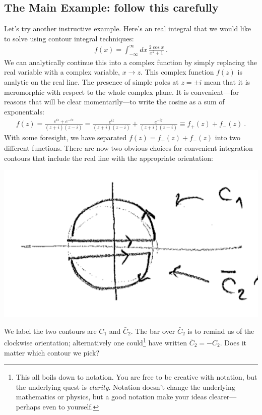 \subsection{The Main Example: follow this carefully}
Let's try another instructive example. Here's an real integral that we would like to solve using contour integral techniques:
\begin{align}
f(x) = \int_{-\infty}^\infty  dx\,
\frac{2\cos x}{x^2+1} \ .
\end{align}
We can analytically continue this into a complex function by simply replacing the real variable with a complex variable, $x\to z$. This complex function $f(z)$ is analytic on the real line. The presence of simple poles at $z=\pm i$ mean that it is meromorphic with respect to the whole complex plane. It is convenient---for reasons that will be clear momentarily---to write the cosine as a sum of exponentials:
\begin{align}
	f(z) 
	= \frac{e^{iz}+e^{-iz}}{(z+i)(z-i)} 
	= \frac{e^{iz}}{(z+i)(z-i)} + \frac{e^{-iz}}{(z+i)(z-i)} 
	\equiv f_+(z) + f_-(z)
	\ .
\end{align}
With some foresight, we have separated $f(z)=f_+(z)+f_-(z)$ into two different functions. 
%
There are now two obvious choices for convenient integration contours that include the real line with the appropriate orientation:
\begin{center}
\includegraphics[width=.5\textwidth]{figures/Lec_2017_14_whichcontour.png}
\end{center}
We label the two contours are $C_1$ and $\bar C_2$. The bar over $\bar C_2$ is to remind us of the clockwise orientation; alternatively one could\footnote{This all boils down to notation. You are free to be creative with notation, but the underlying quest is \emph{clarity}. Notation doesn't change the underlying mathematics or physics, but a good notation make your ideas clearer---perhaps even to yourself.} have written $\bar C_2 = -C_2$.  Does it matter which contour we pick?

